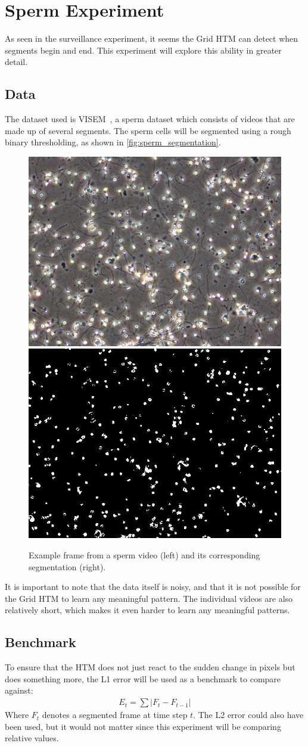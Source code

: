 \section{Sperm Experiment}
As seen in the surveillance experiment, it seems the Grid HTM can detect when segments begin and end. This experiment will explore this ability in greater detail.
\subsection{Data}
The dataset used is VISEM~\cite{VISEM}, a sperm dataset which consists of videos that are made up of several segments. The sperm cells will be segmented using a rough binary thresholding, as shown in \autoref{fig:sperm_segmentation}.
\begin{figure}[H]
    \centering
    \includegraphics[width=.45\textwidth]{resources/experiments/sperm/sperm_example.png}
    \includegraphics[width=.45\textwidth]{resources/experiments/sperm/sperm_seg_example.png}
    \caption[Sperm Example Frame]{Example frame from a sperm video (left) and its corresponding segmentation (right).}
    \label{fig:sperm_segmentation}
\end{figure}
It is important to note that the data itself is noisy, and that it is not possible for the Grid HTM to learn any meaningful pattern. The individual videos are also relatively short, which makes it even harder to learn any meaningful patterns.
\subsection{Benchmark}
To ensure that the HTM does not just react to the sudden change in pixels but does something more, the L1 error will be used as a benchmark to compare against:
\begin{align*}
    E_t=\sum|F_t-F_{t-1}|
\end{align*}
Where $F_t$ denotes a segmented frame at time step $t$. The L2 error could also have been used, but it would not matter since this experiment will be comparing relative values.
